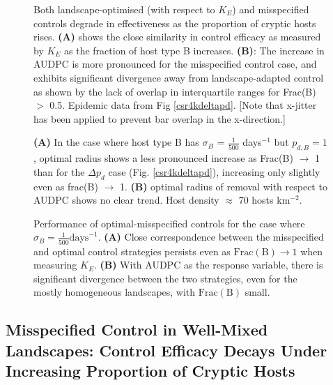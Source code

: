 \documentclass[prstpaper]{revtex4-2}
\begin{document}
\begin{figure}[hbt!]
%

\caption{\label{} Both landscape-optimised (with respect to $K_{E}$) and misspecified controls degrade in effectiveness as the proportion of cryptic hosts rises. \textbf{(A)} shows the close similarity in control efficacy as measured by $K_E$ as the fraction of host type B increases. \textbf{(B)}: The increase in AUDPC is more pronounced for the misspecified control case, and exhibits significant divergence away from landscape-adapted control as shown by the lack of overlap in interquartile ranges for Frac(B) $>$ 0.5. Epidemic data from Fig \ref{csr4kdeltapd}. [Note that x-jitter has been applied to prevent bar overlap in the x-direction.]}
\end{figure}

\begin{figure}[hbt!]

\caption{\label{sigma4kcsrsym} \textbf{(A)} In the case where host type B has $\sigma_B$ = $\frac{1}{500}$ days$^{-1}$ but $p_{d,B} = 1$, optimal radius shows a less pronounced increase as Frac(B) $\rightarrow$ 1 than for the $\Delta p_{d}$  case (Fig. \ref{csr4kdeltapd}), increasing only slightly even as frac(B) $\rightarrow$ 1. \textbf{(B)} optimal radius of removal with respect to AUDPC shows no clear trend. Host density $\approx$ 70 hosts km$^{-2}$. }
\end{figure}

\begin{figure}[hbt!]

\caption{\label{compare_strategies_delta_sigma} Performance of optimal-misspecified controls for the  case where $\sigma_{B} = \frac{1}{500} \mathrm{days}^{-1}$. \textbf{(A)} Close correspondence between the misspecified and optimal control strategies persists even as $\mathrm{Frac(B)} \rightarrow 1$ when measuring $K_{E}$.  \textbf{(B)} With AUDPC as the response variable, there is significant divergence between the two strategies, even for the mostly homogeneous landscapes, with $\mathrm{Frac(B)}$ small.}
\end{figure}



\subsection{Misspecified Control in Well-Mixed Landscapes: Control Efficacy Decays Under Increasing Proportion of Cryptic Hosts}
\end{document}
